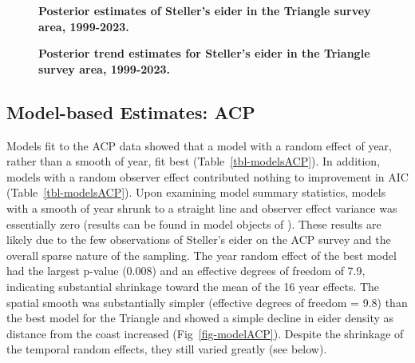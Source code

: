 \documentclass[
  10pt,
  letterpaper,
]{article}
\begin{document}
\begin{figure}

\caption{\label{fig-yearABR}\textbf{Posterior estimates of Steller's eider in the Triangle survey area, 1999-2023.}}

\end{figure}%

\begin{figure}

\caption{\label{fig-trendABR}\textbf{Posterior trend estimates for Steller's eider in the Triangle survey area, 1999-2023.} }

\end{figure}%

\subsection{Model-based Estimates: ACP}\label{model-based-estimates-acp}

Models fit to the ACP data showed that a model with a random effect of
year, rather than a smooth of year, fit best
(Table~\ref{tbl-modelsACP}). In addition, models with a random observer
effect contributed nothing to improvement in AIC
(Table~\ref{tbl-modelsACP}). Upon examining model summary statistics,
models with a smooth of year shrunk to a straight line and observer
effect variance was essentially zero (results can be found in model
objects of ). These results are likely due to the
few observations of Steller's eider on the ACP survey and the overall
sparse nature of the sampling. The year random effect of the best model
had the largest p-value (0.008) and an effective degrees of freedom of
7.9, indicating substantial shrinkage toward the mean of the 16 year
effects. The spatial smooth was substantially simpler (effective degrees
of freedom = 9.8) than the best model for the Triangle and showed a
simple decline in eider density as distance from the coast increased
(Fig~\ref{fig-modelACP}). Despite the shrinkage of the temporal random
effects, they still varied greatly (see below).
\end{document}
